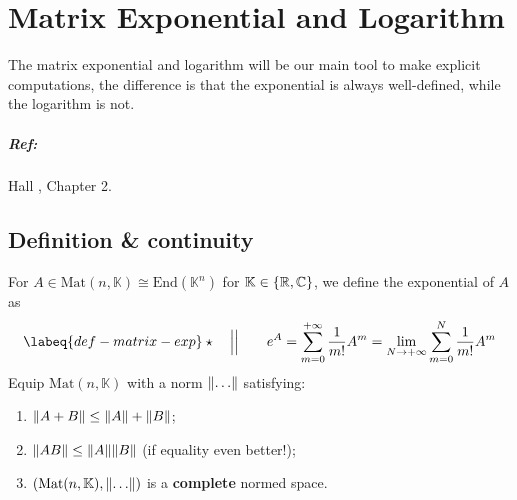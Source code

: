 \documentclass[../main.tex]{subfiles}
\begin{document}
\setchapterpreamble[u]{\margintoc}
\chapter[Matrix Exponential and Logarithm]{Matrix Exponential and Logarithm\footnotemark[0]}
The matrix exponential and logarithm will be our main tool to make explicit computations, the difference is that the exponential is always well-defined, while the logarithm is not.
\paragraph{Ref:} Hall \cite{Hall2015}, Chapter 2.
\section{Definition \& continuity}
\begin{definition}
For $A\in\textrm{Mat}(n,\mathbb{K})\cong \textrm{End}(\mathbb{K}^n)$ for $\mathbb{K}\in \Bqty{\mathbb{R},\mathbb{C}}$, we define the exponential of $A$ as
\begin{equation}\labeq{def-matrix-exp}
\star \quad \Big|\Big| \qquad e^A=\sum_{m=0}^{+\infty}\frac{1}{m!}A^m=\lim_{N\to+\infty}\sum_{m=0}^N\frac{1}{m!}A^m
\end{equation}
Equip $\textrm{Mat}(n,\mathbb{K})$ with a norm $\norm{\dots}$ satisfying:
\renewcommand{\labelenumi}{\Roman{enumi})}
\begin{enumerate}
    \item $\norm{A+B}\leq \norm{A}+\norm{B}$;
    \item $\norm{AB}\leq\norm{A}\norm{B}$ (if equality even better!);
    \item $\left(\textrm{Mat}(n,\mathbb{K}),\norm{\dots}\right)$ is a \textbf{complete} normed space.
\end{enumerate}
\end{definition}
\end{document}
